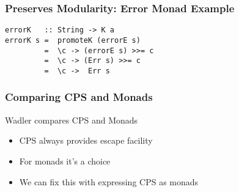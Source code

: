 \documentclass{beamer}
\begin{document}
\begin{frame}[fragile]
\frametitle{Preserves Modularity: Error Monad Example}

\begin{lstlisting}
errorK   :: String -> K a
errorK s =  promoteK (errorE s)
         =  \c -> (errorE s) >>= c
         =  \c -> (Err s) >>= c
         =  \c ->  Err s
\end{lstlisting}


\end{frame}


\begin{frame}[fragile]
\frametitle{Comparing CPS and Monads}
Wadler compares CPS and Monads
\begin{itemize}
\item CPS always provides escape facility
\item For monads it's a choice
\item We can fix this with expressing CPS as monads
\end{itemize}
\end{frame}
\end{document}

